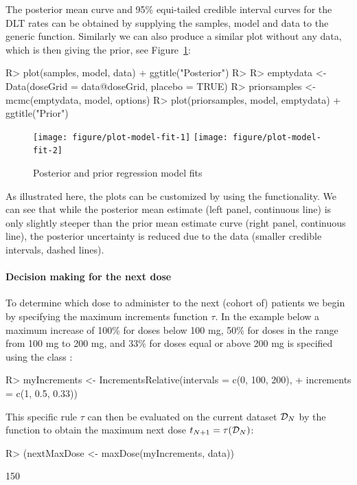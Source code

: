 \documentclass[article]{jss}\usepackage[]{graphicx}\usepackage[]{color}
\begin{document}
The posterior mean curve and 95\% equi-tailed credible interval curves for the 
DLT rates can be obtained by supplying
the samples, model and data to the generic  function. Similarly we can 
also produce a similar plot without any data, which is then giving the prior, see Figure~\ref{fig:plot-model-fit}:

\begin{Schunk}
\begin{Sinput}
R> plot(samples, model, data) + ggtitle("Posterior")
R> 
R> emptydata <- Data(doseGrid = data@doseGrid, placebo = TRUE)
R> priorsamples <- mcmc(emptydata, model, options)
R> plot(priorsamples, model, emptydata) + ggtitle("Prior")
\end{Sinput}
\begin{figure}

{\centering \texttt{[image: figure/plot-model-fit-1]} \texttt{[image: figure/plot-model-fit-2]} 

}

\caption[Posterior and prior regression model fits]{Posterior and prior regression model fits}\label{fig:plot-model-fit}
\end{figure}
\end{Schunk}
As illustrated here, the plots can be customized by using the  \citep{ggplot2}
functionality. We can see that while the posterior mean estimate (left panel, continuous line)
is only slightly steeper than the prior mean estimate curve (right panel, continuous line),
the posterior uncertainty is reduced due to the data (smaller credible intervals, dashed lines). 

\paragraph{Decision making for the next dose}
To determine which dose to administer to the next (cohort of) patients we begin by 
specifying the maximum increments function $\tau$. In the example below a maximum increase of 100\%
for doses below 100 mg, 50\% for doses in the range from 100 mg to 200 mg, and 33\% 
for doses equal or above 200 mg is specified using the class :
\begin{Schunk}
\begin{Sinput}
R> myIncrements <- IncrementsRelative(intervals = c(0, 100, 200), 
+                                     increments = c(1, 0.5, 0.33))
\end{Sinput}
\end{Schunk}
This specific rule $\tau$ can then be evaluated on the current dataset ${\cal D}_{N}$ by 
the  function to obtain the maximum next dose $t_{N+1} = \tau({\cal D}_{N})$:
\begin{Schunk}
\begin{Sinput}
R> (nextMaxDose <- maxDose(myIncrements, data))
\end{Sinput}
\begin{Soutput}
[1] 150
\end{Soutput}
\end{Schunk}
\end{document}

